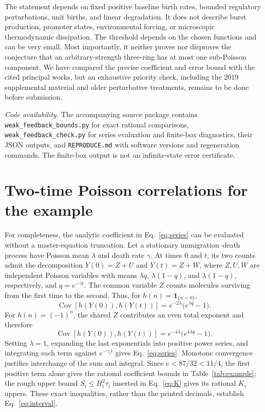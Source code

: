 \documentclass[aps,pre,twocolumn,showpacs,amsmath,amssymb]{revtex4-2}
\begin{document}
The statement depends on fixed positive baseline birth rates, bounded regulatory perturbations, unit births, and linear degradation. It does not describe burst production, promoter states, environmental forcing, or microscopic thermodynamic dissipation. The threshold depends on the chosen functions and can be very small. Most importantly, it neither proves nor disproves the conjecture that an arbitrary-strength three-ring has at most one sub-Poisson component. We have compared the precise coefficient and error bound with the cited principal works, but an exhaustive priority check, including the 2019 supplemental material and older perturbative treatments, remains to be done before submission.

\textit{Code availability.} The accompanying source package contains \texttt{weak\_feedback\_bounds.py} for exact rational comparisons, \texttt{weak\_feedback\_check.py} for series evaluation and finite-box diagnostics, their JSON outputs, and \texttt{REPRODUCE.md} with software versions and regeneration commands. The finite-box output is not an infinite-state error certificate.

\appendix
\section{Two-time Poisson correlations for the example}
For completeness, the analytic coefficient in Eq.~\eqref{eq:series} can be evaluated without a master-equation truncation. Let a stationary immigration--death process have Poisson mean $\lambda$ and death rate $\gamma$. At times $0$ and $t$, its two counts admit the decomposition $Y(0)=Z+U$ and $Y(t)=Z+W$, where $Z,U,W$ are independent Poisson variables with means $\lambda q$, $\lambda(1-q)$, and $\lambda(1-q)$, respectively, and $q=e^{-\gamma t}$. The common variable $Z$ counts molecules surviving from the first time to the second. Thus, for $h(n)=\mathbf1_{\{n=0\}}$,
\begin{equation}
\operatorname{Cov}[h(Y(0)),h(Y(t))]
=e^{-2\lambda}\bigl(e^{\lambda q}-1\bigr).
\label{eq:zero-cov}
\end{equation}
For $h(n)=(-1)^n$, the shared $Z$ contributes an even total exponent and therefore
\begin{equation}
\operatorname{Cov}[h(Y(0)),h(Y(t))]
=e^{-4\lambda}\bigl(e^{4\lambda q}-1\bigr).
\label{eq:parity-cov}
\end{equation}
Setting $\lambda=1$, expanding the last exponentials into positive power series, and integrating each term against $e^{-\gamma_i t}$ gives Eq.~\eqref{eq:series}. Monotone convergence justifies interchange of the sum and integral. Since $e<87/32<11/4$, the first positive term alone gives the rational coefficient bounds in Table~\ref{tab:example}; the rough upper bound $S_i\leq H_i^2\tau_i$ inserted in Eq.~\eqref{eq:K} gives its rational $K_i$ uppers. These exact inequalities, rather than the printed decimals, establish Eq.~\eqref{eq:interval}.
\end{document}
